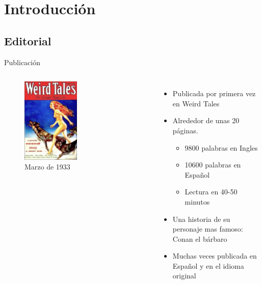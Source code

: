 \section{Introducción}
\subsection{Editorial}
\begin{frame}{Publicación}
\begin{columns}
    \begin{figure}[htb]
    \centering
        \includegraphics[width=0.5\textwidth]{img/WeirdTales-1933-03}
        \caption{Marzo de 1933}
    \end{figure}    
    \begin{itemize}
         \item Publicada por primera vez en Weird Tales
         \item Alrededor de unas 20 páginas.
         \begin{itemize}
            \item 9800 palabras en Ingles
            \item 10600 palabras en Español
            \item Lectura en 40-50 minutos
         \end{itemize}
         \item Una historia de su personaje mas famoso: Conan el bárbaro
         \item Muchas veces publicada en Español y en el idioma original
    \end{itemize}
\end{columns}
\end{frame}

